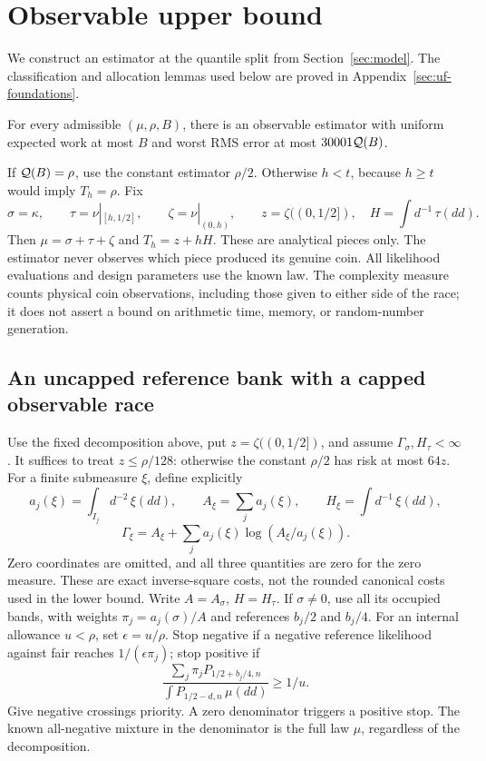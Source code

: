 \section{Observable upper bound}\label{sec:direct-upper}
We construct an estimator at the quantile split from
Section~\ref{sec:model}. The classification and allocation lemmas
used below are proved in Appendix~\ref{sec:uf-foundations}.

\begin{theorem}\label{thm:direct-upper}
For every admissible $(\mu,\rho,B)$, there is an observable estimator
with uniform expected work at most $B$ and worst RMS error at most
$30001\mathcal Q(B)$.
\end{theorem}

If $\mathcal Q(B)=\rho$, use the constant estimator $\rho/2$.
Otherwise $h<t$, because $h\ge t$ would imply $T_h=\rho$.
Fix
\[
 \sigma=\kappa,\qquad \tau=\nu|_{[h,1/2]},\qquad
 \zeta=\nu|_{(0,h)},\qquad z=\zeta((0,1/2]),\quad
 H=\int d^{-1}\,\tau(dd).
\]
Then $\mu=\sigma+\tau+\zeta$ and $T_h=z+hH$.
These are analytical pieces only. The estimator never observes which
piece produced its genuine coin.
All likelihood evaluations and design parameters use the known law.
The complexity measure counts physical coin observations, including those
given to either side of the race; it does not assert a bound on arithmetic
time, memory, or random-number generation.

\subsection{An uncapped reference bank with a capped observable race}

Use the fixed decomposition above, put
$z=\zeta((0,1/2])$, and assume $\Gamma_\sigma,H_\tau<\infty$.
It suffices to treat $z\le\rho/128$: otherwise the constant $\rho/2$
has risk at most $64z$. For a finite submeasure $\xi$, define explicitly
\[
 a_j(\xi)=\int_{I_j}d^{-2}\,\xi(dd),\qquad
 A_\xi=\sum_j a_j(\xi),\qquad H_\xi=\int d^{-1}\,\xi(dd),
\]
\[
 \Gamma_\xi=A_\xi+\sum_j a_j(\xi)\log(A_\xi/a_j(\xi)).
\]
Zero coordinates are omitted, and all three quantities are zero for the
zero measure. These are exact inverse-square costs, not the rounded
canonical costs used in the lower bound. Write $A=A_\sigma$, $H=H_\tau$.
If $\sigma\ne0$, use all its occupied bands, with weights
$\pi_j=a_j(\sigma)/A$ and references $b_j/2$ and $b_j/4$.
For an internal allowance $u<\rho$, set $\epsilon=u/\rho$.
Stop negative if a negative reference likelihood against fair reaches
$1/(\epsilon\pi_j)$; stop positive if
\begin{equation}\label{eq:split-bank-ratio}
 \frac{\sum_j\pi_jP_{1/2+b_j/4,n}}
      {\int P_{1/2-d,n}\,\mu(dd)}\ge1/u.
\end{equation}
Give negative crossings priority. A zero denominator triggers a positive
stop. The known all-negative mixture in the denominator is the full law
$\mu$, regardless of the decomposition.

